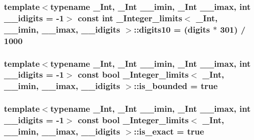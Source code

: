 \subsubsection[{digits10}]{\setlength{\rightskip}{0pt plus 5cm}template$<$typename \+\_\+\+Int, \+\_\+\+Int \+\_\+\+\_\+imin, \+\_\+\+Int \+\_\+\+\_\+imax, int \+\_\+\+\_\+idigits = -\/1$>$ const int {\bf \+\_\+\+Integer\+\_\+limits}$<$ \+\_\+\+Int, \+\_\+\+\_\+imin, \+\_\+\+\_\+imax, \+\_\+\+\_\+idigits $>$\+::digits10 = ({\bf digits} $\ast$ 301) / 1000\hspace{0.3cm}{\ttfamily [static]}}\label{class__Integer__limits_aac7b67f2b1558b99b7de11017d5eee9a}
\hypertarget{class__Integer__limits_a35f76560ea89cdd132df7e6b430a6417}{}
\subsubsection[{is\+\_\+bounded}]{\setlength{\rightskip}{0pt plus 5cm}template$<$typename \+\_\+\+Int, \+\_\+\+Int \+\_\+\+\_\+imin, \+\_\+\+Int \+\_\+\+\_\+imax, int \+\_\+\+\_\+idigits = -\/1$>$ const {\bf bool} {\bf \+\_\+\+Integer\+\_\+limits}$<$ \+\_\+\+Int, \+\_\+\+\_\+imin, \+\_\+\+\_\+imax, \+\_\+\+\_\+idigits $>$\+::is\+\_\+bounded = {\bf true}\hspace{0.3cm}{\ttfamily [static]}}\label{class__Integer__limits_a35f76560ea89cdd132df7e6b430a6417}
\hypertarget{class__Integer__limits_a72a8cf71ea00a1e2288b4e98750314e3}{}
\subsubsection[{is\+\_\+exact}]{\setlength{\rightskip}{0pt plus 5cm}template$<$typename \+\_\+\+Int, \+\_\+\+Int \+\_\+\+\_\+imin, \+\_\+\+Int \+\_\+\+\_\+imax, int \+\_\+\+\_\+idigits = -\/1$>$ const {\bf bool} {\bf \+\_\+\+Integer\+\_\+limits}$<$ \+\_\+\+Int, \+\_\+\+\_\+imin, \+\_\+\+\_\+imax, \+\_\+\+\_\+idigits $>$\+::is\+\_\+exact = {\bf true}\hspace{0.3cm}{\ttfamily [static]}}\label{class__Integer__limits_a72a8cf71ea00a1e2288b4e98750314e3}
\hypertarget{class__Integer__limits_a912f15c4744dcbe94c9c98a09d144c59}{}
